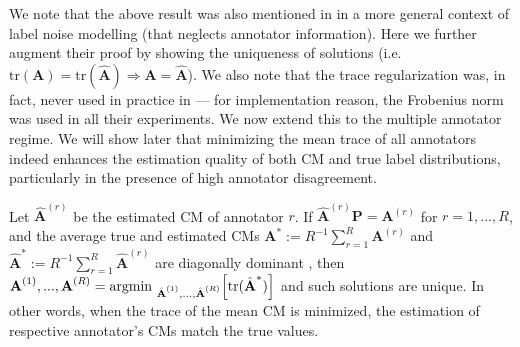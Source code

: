 We note that the above result was also mentioned in \cite{sukhbaatar2014training} in a more general context of label noise modelling (that neglects annotator information). Here we further augment their proof by showing the uniqueness of solutions (i.e.  $\text{tr}(\textbf{A})= \text{tr}(\hat{\textbf{A}})	\Rightarrow \textbf{A} = \hat{\textbf{A}}$). We also note that the trace regularization was, in fact, never used in practice in \cite{sukhbaatar2014training} --- for implementation reason, the Frobenius norm was used in all their experiments.  We now extend this to the multiple annotator regime. We will show later that minimizing the mean trace of all annotators indeed enhances the estimation quality of both CM and true label distributions, particularly in the presence of high annotator disagreement. 

\begin{theorem}\label{theorem:main}
Let $\hat{\textbf{A}}^{(r)}$ be the estimated CM of annotator $r$. If $\hat{\textbf{A}}^{(r)}\textbf{P}=\textbf{A}^{(r)}$ for $r=1,...,R$, and the average true and estimated CMs $\textbf{A}^{*}:=R^{-1}\sum_{r=1}^R\textbf{A}^{(r)}$ and $\hat{\textbf{A}}^{*}:=R^{-1}\sum_{r=1}^R\hat{\textbf{A}}^{(r)}$ are diagonally dominant , then  $\textbf{A}^{(1)}, ..., \textbf{A}^{(R)} = \text{argmin }_{\hat{\textbf{A}}^{(1)}, ..., \hat{\textbf{A}}^{(R)}}\Big{[}\text{tr}(\hat{\textbf{A}}^{*})\Big{]}$ and such solutions are unique. In other words, when the trace of the mean CM is minimized, the estimation of respective annotator's CMs match the true values. 
\end{theorem}

